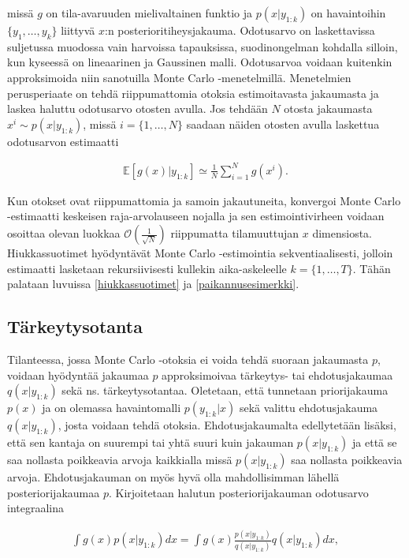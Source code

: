 \documentclass[
  12pt,
  a4paper, twoside]{book}
\begin{document}
\noindent missä \(g\) on tila-avaruuden mielivaltainen funktio ja \(p(x|y_{1:k})\) on havaintoihin \(\{y_1,\ldots,y_k\}\) liittyvä \(x\):n posterioritiheysjakauma. Odotusarvo on laskettavissa suljetussa muodossa vain harvoissa tapauksissa, suodinongelman kohdalla silloin, kun kyseessä on lineaarinen ja Gaussinen malli. Odotusarvoa voidaan kuitenkin approksimoida niin sanotuilla Monte Carlo -menetelmillä. Menetelmien perusperiaate on tehdä riippumattomia otoksia estimoitavasta jakaumasta ja laskea haluttu odotusarvo otosten avulla. Jos tehdään \(N\) otosta jakaumasta \(x^i\sim p(x|y_{1:k})\), missä \(i=\{1,\ldots,N\}\) saadaan näiden otosten avulla laskettua odotusarvon estimaatti

\begin{align}
\mathbb{E}[g(x)|y_{1:k}]\simeq\frac{1}{N}\sum_{i=1}^N g(x^i).
\end{align}

Kun otokset ovat riippumattomia ja samoin jakautuneita, konvergoi Monte Carlo -estimaatti keskeisen raja-arvolauseen nojalla ja sen estimointivirheen voidaan osoittaa olevan luokkaa \(\mathcal{O}(\frac{1}{\sqrt{N}})\) riippumatta tilamuuttujan \(x\) dimensiosta. Hiukkassuotimet hyödyntävät Monte Carlo -estimointia sekventiaalisesti, jolloin estimaatti lasketaan rekursiivisesti kullekin aika-askeleelle \(k=\{1,\ldots, T\}\). Tähän palataan luvuissa \ref{hiukkassuotimet} ja \ref{paikannusesimerkki}.

\subsection{Tärkeytysotanta}

Tilanteessa, jossa Monte Carlo -otoksia ei voida tehdä suoraan jakaumasta \(p\), voidaan hyödyntää jakaumaa \(p\) approksimoivaa tärkeytys- tai ehdotusjakaumaa \(q(x|y_{1:k})\) sekä ns. tärkeytysotantaa. Oletetaan, että tunnetaan priorijakauma \(p(x)\) ja on olemassa havaintomalli \(p(y_{1:k}|x)\) sekä valittu ehdotusjakauma \(q(x|y_{1:k})\), josta voidaan tehdä otoksia. Ehdotusjakaumalta edellytetään lisäksi, että sen kantaja on suurempi tai yhtä suuri kuin jakauman \(p(x|y_{1:k})\) ja että se saa nollasta poikkeavia arvoja kaikkialla missä \(p(x|y_{1:k})\) saa nollasta poikkeavia arvoja. Ehdotusjakauman on myös hyvä olla mahdollisimman lähellä posteriorijakaumaa \(p\). Kirjoitetaan halutun posteriorijakauman odotusarvo integraalina

\begin{align}
\int g(x)p(x|y_{1:k})dx=\int g(x)\frac{p(x|y_{1:k})}{q(x|y_{1:k})}q(x|y_{1:k})dx,
\end{align}
\end{document}
